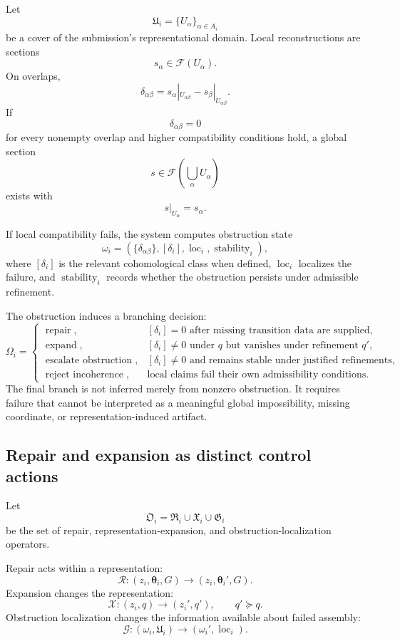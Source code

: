 \documentclass[11pt]{article}
\theoremstyle{definition}
\newcommand{\thetaState}{\boldsymbol{\theta}}
\begin{document}
Let
\[
\mathfrak{U}_i
=
\{U_{\alpha}\}_{\alpha\in A_i}
\]
be a cover of the submission's representational domain. Local reconstructions are sections
\[
s_{\alpha}\in\mathcal{F}(U_{\alpha}).
\]
On overlaps,
\[
\delta_{\alpha\beta}
=
s_{\alpha}|_{U_{\alpha\beta}}
-
s_{\beta}|_{U_{\alpha\beta}}.
\]
If
\[
\delta_{\alpha\beta}=0
\]
for every nonempty overlap and higher compatibility conditions hold, a global section
\[
s\in\mathcal{F}\!\left(
\bigcup_{\alpha}U_{\alpha}
\right)
\]
exists with
\[
s|_{U_\alpha}=s_\alpha.
\]

If local compatibility fails, the system computes obstruction state
\[
\omega_i
=
\left(
\{\delta_{\alpha\beta}\},
[\delta_i],
\operatorname{loc}_i,
\operatorname{stability}_i
\right),
\]
where \([\delta_i]\) is the relevant cohomological class when defined, \(\operatorname{loc}_i\) localizes the failure, and \(\operatorname{stability}_i\) records whether the obstruction persists under admissible refinement.

The obstruction induces a branching decision:
\[
\Omega_i
=
\begin{cases}
\operatorname{repair},&
[\delta_i]=0
\text{ after missing transition data are supplied},
\\
\operatorname{expand},&
[\delta_i]\neq0
\text{ under }q
\text{ but vanishes under refinement }q',
\\
\operatorname{escalate\ obstruction},&
[\delta_i]\neq0
\text{ and remains stable under justified refinements},
\\
\operatorname{reject\ incoherence},&
\text{local claims fail their own admissibility conditions}.
\end{cases}
\]
The final branch is not inferred merely from nonzero obstruction. It requires failure that cannot be interpreted as a meaningful global impossibility, missing coordinate, or representation-induced artifact.

\subsection{Repair and expansion as distinct control actions}

Let
\[
\mathfrak{O}_i
=
\mathfrak{R}_i
\cup
\mathfrak{X}_i
\cup
\mathfrak{G}_i
\]
be the set of repair, representation-expansion, and obstruction-localization operators.

Repair acts within a representation:
\[
\mathcal{R}:
(z_i,\thetaState_i,G)
\to
(z_i,\thetaState_i',G).
\]
Expansion changes the representation:
\[
\mathcal{X}:
(z_i,q)
\to
(z_i',q'),
\qquad
q'\succeq q.
\]
Obstruction localization changes the information available about failed assembly:
\[
\mathcal{G}:
(\omega_i,\mathfrak{U}_i)
\to
(\omega_i',\operatorname{loc}_i).
\]
\end{document}
